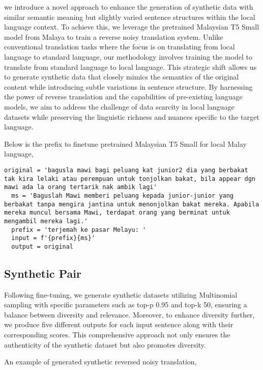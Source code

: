 \documentclass[preprint]{article}
\begin{document}
we introduce a novel approach to enhance the generation of synthetic data with similar semantic meaning but slightly varied sentence structures within the local language context. To achieve this, we leverage the pretrained Malaysian T5 Small model from Malaya \cite{Malaya} to train a reverse noisy translation system. Unlike conventional translation tasks where the focus is on translating from local language to standard language, our methodology involves training the model to translate from standard language to local language. This strategic shift allows us to generate synthetic data that closely mimics the semantics of the original content while introducing subtle variations in sentence structure. By harnessing the power of reverse translation and the capabilities of pre-existing language models, we aim to address the challenge of data scarcity in local language datasets while preserving the linguistic richness and nuances specific to the target language.

Below is the prefix to finetune pretrained Malaysian T5 Small for local Malay language,

\begin{lstlisting}[breaklines=true]
  original = 'bagusla mawi bagi peluang kat junior2 dia yang berbakat tak kira lelaki atau perempuan untuk tonjolkan bakat, bila appear dgn mawi ada la orang tertarik nak ambik lagi'
  ms = 'Baguslah Mawi memberi peluang kepada junior-junior yang berbakat tanpa mengira jantina untuk menonjolkan bakat mereka. Apabila mereka muncul bersama Mawi, terdapat orang yang berminat untuk mengambil mereka lagi.'
  prefix = 'terjemah ke pasar Melayu: '
  input = f'{prefix}{ms}'
  output = original
\end{lstlisting}

\subsection{Synthetic Pair}

Following fine-tuning, we generate synthetic datasets utilizing Multinomial sampling with specific parameters such as top-p 0.95 and top-k 50, ensuring a balance between diversity and relevance. Moreover, to enhance diversity further, we produce five different outputs for each input sentence along with their corresponding scores. This comprehensive approach not only ensures the authenticity of the synthetic dataset but also promotes diversity.

An example of generated synthetic reversed noisy translation,
\end{document}
